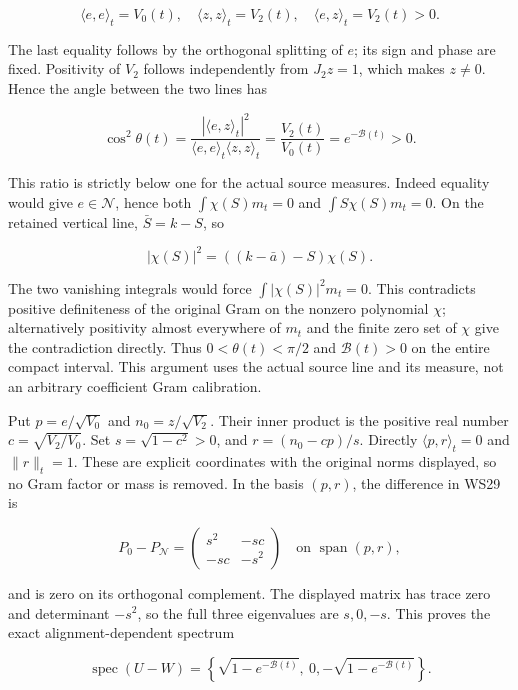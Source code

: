 \[
\langle e,e\rangle_t=V_0(t),\quad
\langle z,z\rangle_t=V_2(t),\quad
\langle e,z\rangle_t=V_2(t)>0.
\tag{WS31}
\]

The last equality follows by the orthogonal splitting of \(e\); its sign and phase are fixed. Positivity of \(V_2\) follows independently from \(J_2z=1\), which makes \(z\ne0\). Hence the angle between the two lines has

\[
\cos^2\theta(t)
=\frac{|\langle e,z\rangle_t|^2}
        {\langle e,e\rangle_t\langle z,z\rangle_t}
=\frac{V_2(t)}{V_0(t)}=e^{-\mathcal B(t)}>0.
\tag{WS32}
\]

This ratio is strictly below one for the actual source measures. Indeed equality would give \(e\in\mathcal N\), hence both \(\int\chi(S)m_t=0\) and \(\int S\chi(S)m_t=0\). On the retained vertical line, \(\bar S=k-S\), so

\[
|\chi(S)|^2=((k-\bar a)-S)\chi(S).
\tag{WS33}
\]

The two vanishing integrals would force \(\int|\chi(S)|^2m_t=0\). This contradicts positive definiteness of the original Gram on the nonzero polynomial \(\chi\); alternatively positivity almost everywhere of \(m_t\) and the finite zero set of \(\chi\) give the contradiction directly. Thus \(0<\theta(t)<\pi/2\) and \(\mathcal B(t)>0\) on the entire compact interval. This argument uses the actual source line and its measure, not an arbitrary coefficient Gram calibration.

Put \(p=e/\sqrt{V_0}\) and \(n_0=z/\sqrt{V_2}\). Their inner product is the positive real number \(c=\sqrt{V_2/V_0}\). Set \(s=\sqrt{1-c^2}>0\), and \(r=(n_0-cp)/s\). Directly \(\langle p,r\rangle_t=0\) and \(\|r\|_t=1\). These are explicit coordinates with the original norms displayed, so no Gram factor or mass is removed. In the basis \((p,r)\), the difference in WS29 is

\[
P_0-P_{\mathcal N}
=\begin{pmatrix}s^2&-sc\\-sc&-s^2\end{pmatrix}
\quad\text{on }\operatorname{span}(p,r),
\tag{WS34}
\]

and is zero on its orthogonal complement. The displayed matrix has trace zero and determinant \(-s^2\), so the full three eigenvalues are \(s,0,-s\). This proves the exact alignment-dependent spectrum

\[
\operatorname{spec}(U-W)
=\left\{\sqrt{1-e^{-\mathcal B(t)}},\ 0,
         -\sqrt{1-e^{-\mathcal B(t)}}\right\}.
\tag{WS35}
\]

